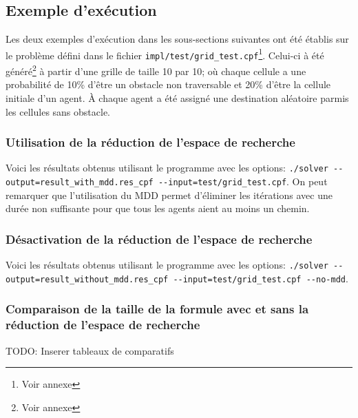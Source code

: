 \documentclass[french, 12pt, letterpaper]{article}
\theoremstyle{definition}
\theoremstyle{proposition}
\theoremstyle{example}
\begin{document}
    

    \subsection{Exemple d'exécution}
    \label{sec:example}

    Les deux exemples d'exécution dans les sous-sections suivantes ont été établis sur le problème défini dans le fichier
    \lstinline{impl/test/grid_test.cpf}\footnote{Voir annexe }. Celui-ci à été généré\footnote{Voir annexe } 
    à partir d'une grille de taille 10 par 10;
    où chaque cellule a une probabilité de 10\% d'être un obstacle non traversable et 20\% d'être la cellule initiale d'un agent.
    À chaque agent a été assigné une destination aléatoire parmis les cellules sans obstacle.

    \subsubsection{Utilisation de la réduction de l'espace de recherche}

    Voici les résultats obtenus utilisant le programme avec les options: \lstinline{./solver --output=result_with_mdd.res_cpf --input=test/grid_test.cpf}.
    On peut remarquer que l'utilisation du MDD permet d'éliminer les itérations avec une durée non suffisante pour que tous les agents aient au moins un chemin.

    

    \subsubsection{Désactivation de la réduction de l'espace de recherche}

    Voici les résultats obtenus utilisant le programme avec les options: \lstinline{./solver --output=result_without_mdd.res_cpf --input=test/grid_test.cpf --no-mdd}.

    

    \subsubsection{Comparaison de la taille de la formule avec et sans la réduction de l'espace de recherche}
    \label{sec:compartaille}
    
    TODO: Inserer tableaux de comparatifs
\end{document}
